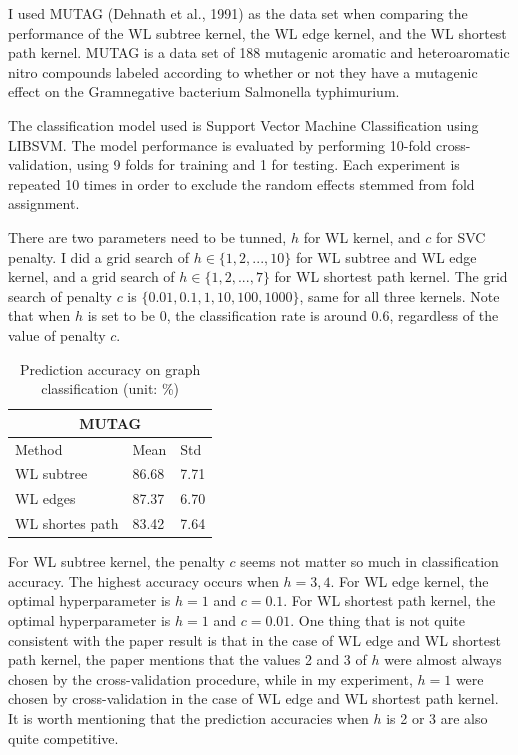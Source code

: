 \documentclass{llncs}
\begin{document}
I used MUTAG (Dehnath et al., 1991) as the data set when comparing the performance of the WL subtree kernel, the WL edge kernel, and the WL shortest path kernel. MUTAG is a data set of 188 mutagenic aromatic and heteroaromatic
nitro compounds labeled according to whether or not they have a mutagenic effect on the Gramnegative bacterium Salmonella typhimurium.  

The classification model used is Support Vector Machine Classification using LIBSVM. The model performance is evaluated by performing 10-fold cross-validation, using 9 folds for training and 1 for testing. Each experiment is repeated 10 times in order to exclude the random effects stemmed from fold assignment. 



There are two parameters need to be tunned, $h$ for WL kernel, and $c$ for SVC penalty. I did a grid search of $h \in \{ 1, 2, ..., 10\}$ for WL subtree and WL edge kernel, and a grid search of $h \in \{ 1, 2, ..., 7\}$ for WL shortest path kernel. The grid search of penalty $c$ is $\{ 0.01, 0.1, 1, 10, 100, 1000\}$, same for all three kernels. Note that when $h$ is set to be 0, the classification rate is around 0.6, regardless of the value of penalty $c$.  


\begin{table}[h!]
\centering
\begin{tabular}{ |p{3cm}||p{3cm}|p{3cm}|}
 \hline
 \multicolumn{3}{|c|}{MUTAG} \\
 \hline
	Method& Mean & Std\\ [0.5ex] 
 \hline
	WL subtree   & 86.68  & 7.71\\
 	WL edges     & 87.37  & 6.70  \\
 	WL shortes path & 83.42 & 7.64 \\ [1ex] 
 \hline
\end{tabular}
\caption{Prediction accuracy on graph classification (unit: \%)}
\label{table:1}
\end{table}

For WL subtree kernel, the penalty $c$ seems not matter so much in classification accuracy. The highest accuracy occurs when $h = 3, 4$.  For WL edge kernel, the optimal hyperparameter is $h = 1$ and $c = 0.1$.  For WL shortest path kernel, the optimal hyperparameter is $h = 1$ and $c = 0.01$. One thing that is not quite consistent with the paper result is that in the case of WL edge and WL shortest path kernel, the paper mentions that the values 2 and 3 of $h$ were almost always chosen by the cross-validation procedure, while in my experiment, $h = 1$ were chosen by cross-validation in the case of WL edge and WL shortest path kernel. It is worth mentioning that the prediction accuracies when $h$ is 2 or 3 are also quite competitive. 
\end{document}
